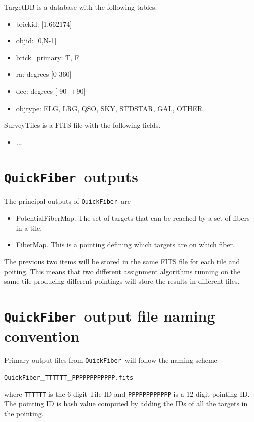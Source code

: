 \documentclass{article}
\newcommand{\code}{{\texttt{QuickFiber}}}
\begin{document}
TargetDB is a database with the following tables.
\begin{itemize}
\item brickid: [1,662174]
\item objid: [0,N-1]
\item brick\_primary: T, F
\item ra: degrees [0-360]
\item dec: degrees [-90 -+90]
\item objtype: ELG, LRG, QSO, SKY, STDSTAR, GAL, OTHER
\end{itemize}

\noindent
SurveyTiles is a FITS file with the following fields.
\begin{itemize}
\item ...
\end{itemize}


\section{\code\ outputs}

The principal outputs of \code\ are
\begin{itemize}
\item PotentialFiberMap. The set of targets that can be reached by a
  set of fibers in a  tile.  
\item FiberMap. This is a pointing defining which targets are on which
  fiber.
\end{itemize}

The previous two items will be stored in the same FITS file for each
tile and poiting. This means that two different assignment algorithms
running on the same tile producing different pointings will store
the results in different files. 

\section{\code\ output file naming convention}

Primary output files from \code\ will follow the naming scheme

\begin{center}
\code\_{\texttt{TTTTTT}}\_{\texttt{PPPPPPPPPPPP.fits}}
\end{center}
\noindent
where \texttt{TTTTTT} is the 6-digit Tile ID and \texttt{PPPPPPPPPPPP} is
a 12-digit pointing ID. The pointing ID is hash value computed by
adding the IDs of all the targets in the pointing. 
\end{document}
